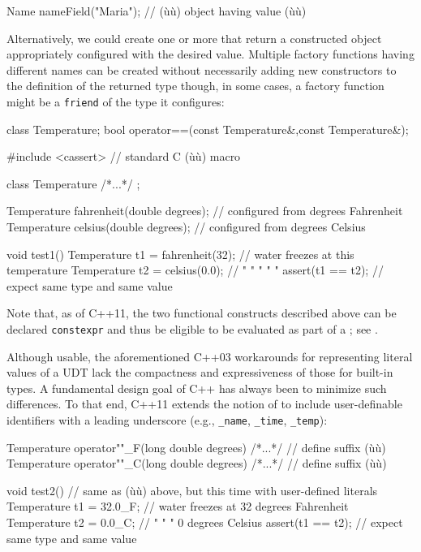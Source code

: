 \begin{emcppslisting}[emcppsbatch=e1]
Name nameField("Maria");  // (ù{}ù) object having value (ù{}ù)
\end{emcppslisting}

\noindent Alternatively, we could create one or more 
that return a constructed object appropriately configured with the
desired value. Multiple factory functions having different names can be
created without necessarily adding new constructors to the definition of
the returned type though, in some cases, a factory function might be a
\lstinline!friend! of the type it configures:

\begin{emcppshiddenlisting}[emcppsbatch=e2]
class Temperature;
bool operator==(const Temperature&,const Temperature&);
\end{emcppshiddenlisting}
\begin{emcppslisting}[emcppsbatch=e2]
#include <cassert>  // standard C (ù{}ù) macro

class Temperature { /*...*/ };

Temperature fahrenheit(double degrees);  // configured from degrees Fahrenheit
Temperature celsius(double degrees);     // configured from degrees Celsius

void test1()
{
    Temperature t1 = fahrenheit(32);  // water freezes at this temperature
    Temperature t2 = celsius(0.0);    //   "      "     "  "        "
    assert(t1 == t2);                 // expect same type and same value
}
\end{emcppslisting}

\noindent  Note that, as of C++11, the two functional constructs
described above can be declared \lstinline!constexpr! and thus be eligible
to be evaluated as part of a ; see
.

Although usable, the aforementioned C++03 workarounds for representing
literal values of a UDT lack the compactness and expressiveness of those
for built-in types. A fundamental design goal of C++ has always been to
minimize such differences. To that end, C++11 extends the notion of
 to include user-definable identifiers with
a leading underscore (e.g., \lstinline!_name!, \lstinline!_time!,
\lstinline!_temp!):

\begin{emcppslisting}[emcppsbatch=e2]
Temperature operator""_F(long double degrees) { /*...*/ }  // define suffix (ù{}ù)
Temperature operator""_C(long double degrees) { /*...*/ }  // define suffix (ù{}ù)

void test2()  // same as (ù{}ù) above, but this time with user-defined literals
{
    Temperature t1 = 32.0_F; // water freezes at 32 degrees Fahrenheit
    Temperature t2 = 0.0_C;  //   "      "     "  0 degrees Celsius
    assert(t1 == t2);        // expect same type and same value
}
\end{emcppslisting}

